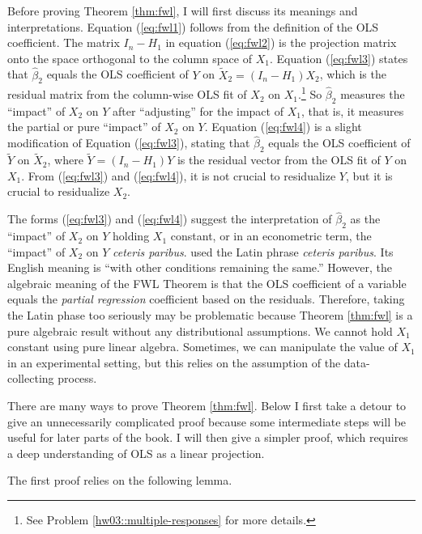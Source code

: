 Before proving Theorem \ref{thm:fwl}, I will first discuss its meanings
and interpretations. Equation (\ref{eq:fwl1}) follows from the definition
of the OLS coefficient. The matrix $I_{n}-H_{1}$ in equation (\ref{eq:fwl2})
is the projection matrix onto the space orthogonal to the column
space of $X_{1}$. Equation (\ref{eq:fwl3}) states that $\hat{\beta}_{2}$
equals the OLS coefficient of $Y$ on $\tilde{X}_{2}=(I_{n}-H_{1})X_{2}$,
which is the residual matrix from the column-wise OLS fit of $X_{2}$
on $X_{1}$.\footnote{See Problem \ref{hw03::multiple-responses} for more details. } So $\hat{\beta}_{2}$ measures the ``impact'' of $X_{2}$
on $Y$ after ``adjusting'' for the impact of $X_{1}$, that is, it
measures the partial or pure ``impact'' of $X_{2}$ on $Y$. Equation
(\ref{eq:fwl4}) is a slight modification of Equation (\ref{eq:fwl3}),
stating that $\hat{\beta}_{2}$ equals the OLS coefficient of $\tilde{Y}$
on $\tilde{X}_{2}$, where $\tilde{Y}=(I_{n}-H_{1})Y$ is the residual
vector from the OLS fit of $Y$ on $X_{1}$. From (\ref{eq:fwl3}) and
(\ref{eq:fwl4}), it is not crucial to residualize $Y$, but
it is crucial to residualize $X_{2}$. 

The forms (\ref{eq:fwl3}) and (\ref{eq:fwl4}) suggest the interpretation of
$\hat{\beta}_{2}$ as the ``impact'' of $X_{2}$ on $Y$ holding $X_{1}$
constant, or in an econometric term, the ``impact'' of $X_{2}$ on
$Y$ \emph{ceteris paribus}. \citet{marshall1890principles} used the Latin phrase \emph{ceteris paribus}. Its English meaning is ``with other conditions remaining the same.'' 
However, the algebraic meaning of the FWL Theorem is that the OLS coefficient of a variable equals the {\it partial regression} coefficient based on the residuals. 
Therefore, taking the Latin phase too
seriously may be problematic because Theorem \ref{thm:fwl} is a pure algebraic
result without any distributional assumptions. We cannot hold $X_{1}$
constant using pure linear algebra. Sometimes, we can manipulate the value
of $X_{1}$ in an experimental setting, but this relies on the assumption of the data-collecting process. 

There are many ways to prove Theorem \ref{thm:fwl}. Below I first take
a detour to give an unnecessarily complicated proof because some intermediate
steps will be useful for later parts of the book. I will then give a
simpler proof, which requires a deep understanding of OLS as a linear projection. 


The first proof relies on the following lemma. 

